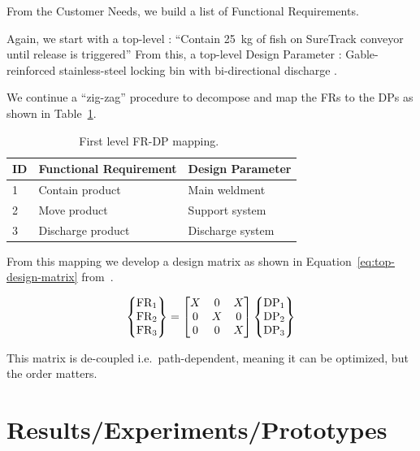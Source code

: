 \documentclass{svproc}
\begin{document}
From the Customer Needs, we build a list of Functional Requirements.

Again, we start with a top-level : ``Contain \SI{25}{\kilogram} of fish on SureTrack conveyor until release is triggered''
From this, a top-level Design Parameter : Gable-reinforced stainless-steel locking bin with bi-directional discharge
\cite{gerhard2016suretrack}.

We continue a ``zig-zag'' procedure to decompose and map the FRs to the DPs as shown in Table~\ref{tab:first_level-frdp}.

\begin{table}
  \center
  \caption{First level FR-DP mapping.~\cite{gerhard2016suretrack}}\label{tab:first_level-frdp}
  \begin{tabular}{lll} \toprule
    ID& Functional Requirement & Design Parameter \\ \midrule 
    1&Contain product&Main weldment\\
    2&Move product&Support system\\
    3&Discharge product &Discharge system\\
    \bottomrule
  \end{tabular}
\end{table}

From this mapping we develop a design matrix as shown in Equation~\ref{eq:top-design-matrix} from~\cite{gerhard2016suretrack}.

\begin{equation}\label{eq:top-design-matrix}
\begin{Bmatrix}
\text{FR}_{1}\\
\text{FR}_{2}\\
\text{FR}_{3}
\end{Bmatrix}=
\begin{bmatrix}
X &  0 & X\\
0 &  X & 0\\
0 &  0 & X
\end{bmatrix}
\begin{Bmatrix}
\text{DP}_{1}\\
\text{DP}_{2}\\
\text{DP}_{3}
\end{Bmatrix}
\end{equation}

This matrix is de-coupled i.e.\ path-dependent, meaning it can be optimized, but the order matters.

\section{Results/Experiments/Prototypes}\label{sec:rep}
\end{document}
